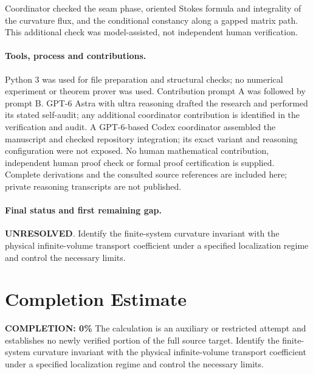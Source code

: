 \documentclass[11pt]{article}
\begin{document}
Coordinator checked the seam phase, oriented Stokes formula and integrality of the curvature flux, and the conditional constancy along a gapped matrix path. This additional check was model-assisted, not independent human verification.

\paragraph{Tools, process and contributions.}
Python 3 was used for file preparation and structural checks; no numerical experiment or theorem prover was used. Contribution prompt A was followed by prompt B. GPT-6 Astra with ultra reasoning drafted the research and performed its stated self-audit; any additional coordinator contribution is identified in the verification and audit. A GPT-6-based Codex coordinator assembled the manuscript and checked repository integration; its exact variant and reasoning configuration were not exposed. No human mathematical contribution, independent human proof check or formal proof certification is supplied. Complete derivations and the consulted source references are included here; private reasoning transcripts are not published.

\paragraph{Final status and first remaining gap.}
\textbf{UNRESOLVED}. Identify the finite-system curvature invariant with the physical infinite-volume transport coefficient under a specified localization regime and control the necessary limits.

\section{Completion Estimate}
\noindent\textbf{COMPLETION: 0\%}
The calculation is an auxiliary or restricted attempt and establishes no newly verified portion of the full source target. Identify the finite-system curvature invariant with the physical infinite-volume transport coefficient under a specified localization regime and control the necessary limits.
\end{document}
